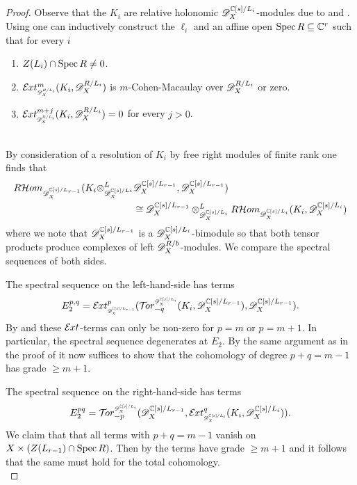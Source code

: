 \begin{proof}
    Observe that the $K_i$ are relative holonomic $\mathscr{D}_X^{\mathbb{C}[s]/L_i}$-modules due to  and .
    Using  one can inductively construct the $\ell_i$ and an affine open $\operatorname{Spec} R\subseteq \mathbb{C}^r$ such that for every $i$
    \begin{enumerate}[label=(\Roman*)]
      \item $Z(L_i)\cap \operatorname{Spec} R \neq 0$.
      \item $\Ex{\D_X^{R/L_i}}{m}(K_i,\D_X^{R/L_i})$ is $m$-Cohen-Macaulay over $\mathscr{D}_X^{R/L_i}$ or zero.
      \item $\Ex{\D_X^{R/L_i}}{m+j}(K_i,\D_X^{R/L_i}) = 0$ for every $j>0$.
    \end{enumerate}
    \ \\

    By consideration of a resolution of $K_i$ by free right modules of finite rank one finds that
  \begin{align*}
    R \mathcal{H}om_{\mathscr{D}_X^{ \mathbb{C}[s]/L_{r-1} }}(K_i\otimes_{ \mathscr{D}_X^{\mathbb{C}[s]/L{i}}  }^L& \mathscr{D}_X^{\mathbb{C}[s]/L_{r-1} },\mathscr{D}_X^{ \mathbb{C}[s]/L_{r-1}} ) \\ &\cong  \mathscr{D}_X^{\mathbb{C}[s]/L_{r-1}}\otimes_{ \mathscr{D}_X^{\mathbb{C}[s]/L_i} }^L R \mathcal{H}om_{ \mathscr{D}_X^{\mathbb{C}[s]/L_{i}} } (K_i,\mathscr{D}_X^{\mathbb{C}[s]/L_{i}})
  \end{align*}
  where we note that $\mathscr{D}_X^{\mathbb{C}[s]/L_{r-1}}$ is a $\mathscr{D}_X^{\mathbb{C}[s]/L_{i}}$-bimodule so that both tensor products produce complexes of left $\mathscr{D}_X^{R/b}$-modules.
  We compare the spectral sequences of both sides.

  The spectral sequence on the left-hand-side has terms
  $$E^{p,q}_2 = \Ex{\D_X^{\C[s]/L_{r-1}}}{p}(\Tr{\D_X^{\C[s]/L_{i}} }{-q}(K_i,\D_X^{\C[s]/L_{r-1}}),\D_X^{\C[s]/L_{r-1}}).$$
  By  and  these $\mathcal{E}\mkern -1mu xt$-terms can only be non-zero for $p=m$ or $p = m+1$.
  In particular, the spectral sequence degenerates at $E_2$.
  By the same argument as in the proof of  it now suffices to show that the cohomology of degree $p + q = m-1$ has grade $\geq m+1$.

  The spectral sequence on the right-hand-side has terms
  $$E_2^{pq} = \Tr{\D_X^{\C[s]/L_{i}} }{-p}( \D_X^{\C[s]/L_{r-1}},\Ex{ \D_X^{\C[s]/L_{i}} }{q} (K_i,\D_X^{\C[s]/L_{i}})).$$
  We claim that that all terms with $p+q = m -1$ vanish on $X\times(Z(L_{r-1})\cap\operatorname{Spec} R)$.
  Then by  the terms have grade $\geq m+1$ and it follows that the same must hold for the total cohomology.
  \\


\end{proof}
